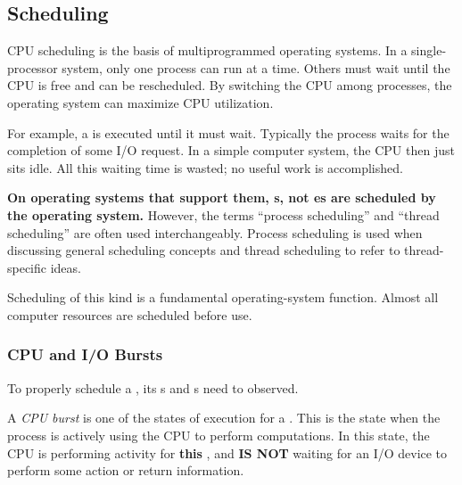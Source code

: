 \subsection{Scheduling}\label{subsec:Scheduling}
CPU scheduling is the basis of multiprogrammed operating systems.
In a single-processor system, only one process can run at a time.
Others must wait until the CPU is free and can be rescheduled.
By switching the CPU among processes, the operating system can maximize CPU utilization.

For example, a  is executed until it must wait.
Typically the process waits for the completion of some I/O request.
In a simple computer system, the CPU then just sits idle.
All this waiting time is wasted; no useful work is accomplished.

\begin{blackbox}
  \textbf{On operating systems that support them, s, not es are scheduled by the operating system.}
  However, the terms ``process scheduling'' and ``thread scheduling'' are often used interchangeably.
  Process scheduling is used when discussing general scheduling concepts and thread scheduling to refer to thread-specific ideas.
\end{blackbox}

Scheduling of this kind is a fundamental operating-system function.
Almost all computer resources are scheduled before use.

\subsubsection{CPU and I/O Bursts}\label{subsubsec:CPU_IO_Bursts}
To properly schedule a , its s and s need to observed.

\begin{definition}\label{def:CPU_Burst}
  A \emph{CPU burst} is one of the states of execution for a .
  This is the state when the process is actively using the CPU to perform computations.
  In this state, the CPU is performing activity for \textbf{this} , and \textbf{IS NOT} waiting for an I/O device to perform some action or return information.
\end{definition}



